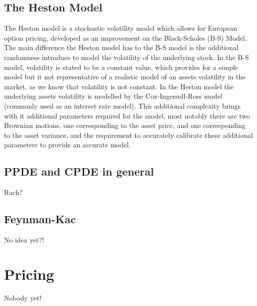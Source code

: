 \documentclass[12pt]{article}
\begin{document}
\subsection{The Heston Model}
The Heston model is a stochastic volatility model which allows for European option pricing, developed as an improvement on the Black-Scholes (B-S) Model. The main difference the Heston model has to the B-S model is the additional randomness introduce to model the volatility of the underlying stock. In the B-S model, volatility is stated to be a constant value, which provides for a simple model but it not representative of a realistic model of an assets volatility in the market, as we know that volatility is not constant. In the Heston model the underlying assets volatility is modelled by the Cox-Ingersoll-Ross model (commonly used as an interest rate model). This additional complexity brings with it additional parameters required for the model, most notably there are two Brownian motions, one corresponding to the asset price, and one corresponding to the asset variance, and the requirement to accurately calibrate these additional parameters to provide an accurate model.

\subsection{PPDE and CPDE in general}
Rach?
\subsection{Feynman-Kac}
No idea yet?!
\section{Pricing}
Nobody yet!
\end{document}

